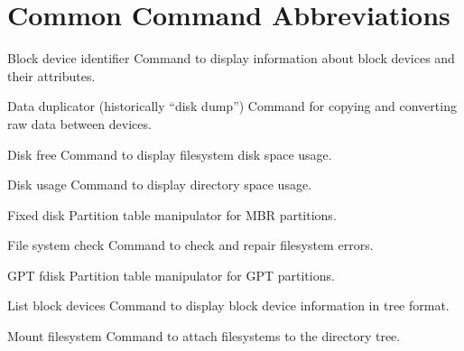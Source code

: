 \documentclass[letterpaper,10pt,english]{sphinxmanual}
\begin{document}
\chapter{Common Command Abbreviations}
\label{\detokenize{glossary:common-command-abbreviations}}\begin{description}
\sphinxAtStartPar
Block device identifier \sphinxhyphen{} Command to display information about block devices and their attributes.

\sphinxAtStartPar
Data duplicator (historically “disk dump”) \sphinxhyphen{} Command for copying and converting raw data between devices.

\sphinxAtStartPar
Disk free \sphinxhyphen{} Command to display filesystem disk space usage.

\sphinxAtStartPar
Disk usage \sphinxhyphen{} Command to display directory space usage.

\sphinxAtStartPar
Fixed disk \sphinxhyphen{} Partition table manipulator for MBR partitions.

\sphinxAtStartPar
File system check \sphinxhyphen{} Command to check and repair filesystem errors.

\sphinxAtStartPar
GPT fdisk \sphinxhyphen{} Partition table manipulator for GPT partitions.

\sphinxAtStartPar
List block devices \sphinxhyphen{} Command to display block device information in tree format.

\sphinxAtStartPar
Mount filesystem \sphinxhyphen{} Command to attach filesystems to the directory tree.


\end{description}
\end{document}
